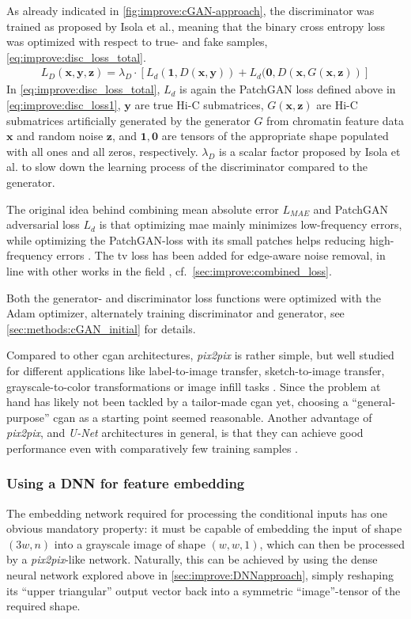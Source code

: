 As already indicated in \cref{fig:improve:cGAN-approach}, the discriminator was trained as proposed by Isola et al.,
meaning that the binary cross entropy loss was optimized with respect to true- and fake samples, \cref{eq:improve:disc_loss_total}.
\begin{align}
 L_D(\mathbf{x,y,z}) = \lambda_D \cdot \left[ L_d(\mathbf{1}, D(\mathbf{x,y})) + L_d(\mathbf{0}, D(\mathbf{x},G(\mathbf{x, z})) \right] \label{eq:improve:disc_loss_total}
\end{align}
In \cref{eq:improve:disc_loss_total}, $L_d$ is again the PatchGAN loss defined above in \cref{eq:improve:disc_loss1}, $\bm{y}$ are true Hi-C submatrices, 
$G(\bm{x},\bm{z})$ are Hi-C submatrices artificially generated by the generator $G$
from chromatin feature data $\bm{x}$ and random noise $\bm{z}$, and $\mathbf{1}, \mathbf{0}$ are tensors of the appropriate shape populated with all ones and all zeros, respectively.
$\lambda_D$ is a scalar factor proposed by Isola et al. to slow down the learning process of the discriminator compared to the generator.

The original idea behind combining mean absolute error $L_\mathit{MAE}$ and PatchGAN adversarial loss $L_d$ is that optimizing \acrshort{mae}
mainly minimizes low-frequency errors, while optimizing the PatchGAN-loss with its small patches helps reducing high-frequency errors \cite{Isola2017}.
The \acrshort{tv} loss has been added for edge-aware noise removal, in line with other works in the field \cite{Hong2020}, cf.~\cref{sec:improve:combined_loss}.

Both the generator- and discriminator loss functions were optimized with the Adam optimizer,
alternately training discriminator and generator, see \cref{sec:methods:cGAN_initial} for details.

Compared to other \acrshort{cgan} architectures, \emph{pix2pix} is rather simple, but well studied for different applications like label-to-image transfer,
sketch-to-image transfer, grayscale-to-color transformations or image infill tasks \cite{Isola2017}.
Since the problem at hand has likely not been tackled by a tailor-made \acrshort{cgan} yet, 
choosing a ``general-purpose'' \acrshort{cgan} as a starting point seemed reasonable.
Another advantage of \emph{pix2pix}, and \emph{U-Net} architectures in general, 
is that they can achieve good performance even with comparatively few training samples \cite{Isola2017, Ronneberger2015}.

\subsubsection{Using a DNN for feature embedding} \label{sec:improve:DNN_embedding}
The embedding network required for processing the conditional inputs
has one obvious mandatory property: it must be capable of embedding the input of shape $(3w,n)$ 
into a grayscale image of shape $(w,w,1)$, which can then be processed by a \emph{pix2pix}-like network.
Naturally, this can be achieved by using the dense neural network explored above in \cref{sec:improve:DNNapproach},
simply reshaping its ``upper triangular'' output vector back into a symmetric ``image''-tensor of the required shape.

